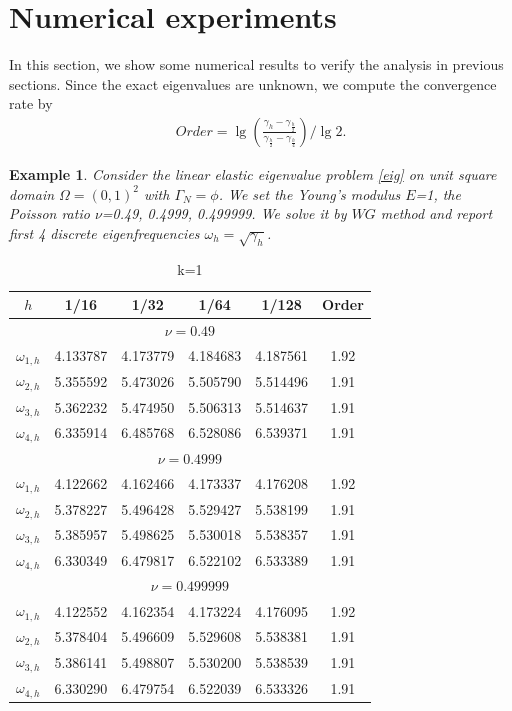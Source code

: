 \documentclass[leqno,CJK]{siamltex704}
\numberwithin{equation}{section}
\newtheorem{example}{Example}[section]
\begin{document}
\section{Numerical experiments}In this section, we show some numerical results to verify the analysis in previous sections. Since the exact eigenvalues are unknown, we compute the convergence rate by
\begin{eqnarray*}
	Order=\lg\left(\frac{\gamma_h-\gamma_{\frac{h}{2}}}{\gamma_{\frac{h}{2}}-\gamma_{\frac{h}{4}}}\right)/\lg2.
\end{eqnarray*}

\begin{example}
	Consider the linear elastic eigenvalue problem \eqref{eig} on unit square domain $\Omega=(0,1)^2$ with $\Gamma_N=\phi$. We set the Young's modulus $E$=1, the Poisson ratio $\nu$=0.49, 0.4999, 0.499999. We solve it by $WG$ method and report first 4 discrete eigenfrequencies $\omega_h=\sqrt{\gamma_h}$.
\end{example}
\begin{table}[H]
	\begin{center}
		\caption{k=1}\label{t1}
		\begin{tabular}{|c|c|c|c|c|c|}\hline
				$h$&1/16&1/32&1/64&1/128&Order\\ \hline\hline
		\multicolumn{6}{|c|}{$\nu=0.49$}\\ \hline
				$\omega_{1,h}$&4.133787 & 4.173779 & 4.184683 & 4.187561  &1.92\\ \hline
				$\omega_{2,h}$&5.355592 & 5.473026 & 5.505790 & 5.514496  &1.91\\ \hline
				$\omega_{3,h}$&5.362232 & 5.474950 & 5.506313 & 5.514637  &1.91\\ \hline
				$\omega_{4,h}$&6.335914 & 6.485768 & 6.528086 & 6.539371  &1.91\\ \hline
		\multicolumn{6}{|c|}{$\nu=0.4999$}\\ \hline
				$\omega_{1,h}$&4.122662 & 4.162466 & 4.173337 & 4.176208  &1.92\\ \hline
				$\omega_{2,h}$&5.378227 & 5.496428 & 5.529427 & 5.538199  &1.91\\ \hline
				$\omega_{3,h}$&5.385957 & 5.498625 & 5.530018 & 5.538357  &1.91\\ \hline
				$\omega_{4,h}$&6.330349 & 6.479817 & 6.522102 & 6.533389  &1.91\\ \hline
		\multicolumn{6}{|c|}{$\nu=0.499999$}\\ \hline
			$\omega_{1,h}$&4.122552 & 4.162354 & 4.173224 & 4.176095  &1.92\\ \hline
			$\omega_{2,h}$&5.378404 & 5.496609 & 5.529608 & 5.538381  &1.91\\ \hline
			$\omega_{3,h}$&5.386141 & 5.498807 & 5.530200 & 5.538539  &1.91\\ \hline
			$\omega_{4,h}$&6.330290 & 6.479754 & 6.522039 & 6.533326  &1.91\\ \hline
		\end{tabular}
	\end{center}
\end{table}
\end{document}
